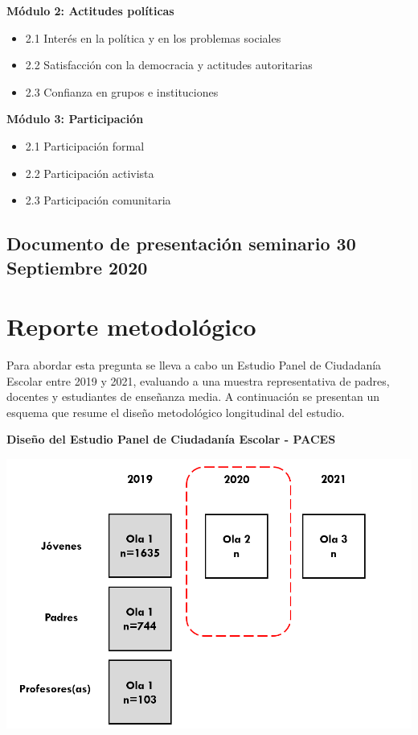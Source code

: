 \documentclass[
  14pt,
]{book}
\providecommand{\tightlist}{%
  \setlength{\itemsep}{0pt}\setlength{\parskip}{0pt}}
\begin{document}
\textbf{Módulo 2: Actitudes políticas}

\begin{itemize}
\tightlist
\item
  2.1 Interés en la política y en los problemas sociales
\item
  2.2 Satisfacción con la democracia y actitudes autoritarias
\item
  2.3 Confianza en grupos e instituciones
\end{itemize}

\textbf{Módulo 3: Participación}

\begin{itemize}
\tightlist
\item
  2.1 Participación formal
\item
  2.2 Participación activista
\item
  2.3 Participación comunitaria
\end{itemize}

\hypertarget{documento-de-presentaciuxf3n-seminario-30-septiembre-2020}{%
\section*{Documento de presentación seminario 30 Septiembre 2020}\label{documento-de-presentaciuxf3n-seminario-30-septiembre-2020}}

\hypertarget{reporte-metodoluxf3gico}{%
\chapter*{Reporte metodológico}\label{reporte-metodoluxf3gico}}

Para abordar esta pregunta se lleva a cabo un Estudio Panel de Ciudadanía Escolar entre 2019 y 2021, evaluando a una muestra representativa de padres, docentes y estudiantes de enseñanza media. A continuación se presentan un esquema que resume el diseño metodológico longitudinal del estudio.

\textbf{Diseño del Estudio Panel de Ciudadanía Escolar - PACES}

\begin{center}\includegraphics[width=0.8\linewidth,]{images/diseno1} \end{center}
\end{document}
